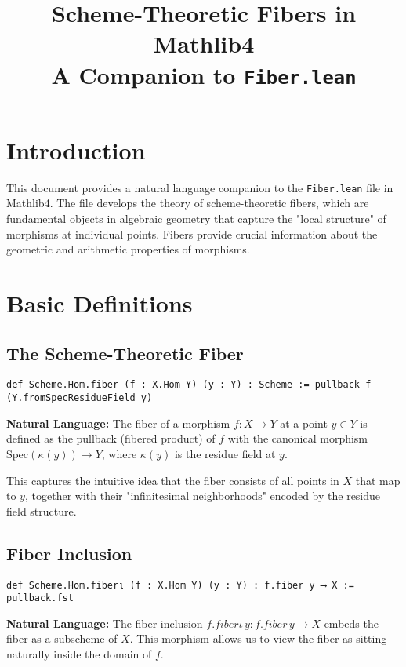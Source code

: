 \documentclass{article}
\title{Scheme-Theoretic Fibers in Mathlib4\\
\large A Companion to \texttt{Fiber.lean}}
\author{}
\date{}
\theoremstyle{definition}
\begin{document}
\maketitle

\section{Introduction}

This document provides a natural language companion to the \texttt{Fiber.lean} file in Mathlib4. The file develops the theory of scheme-theoretic fibers, which are fundamental objects in algebraic geometry that capture the "local structure" of morphisms at individual points. Fibers provide crucial information about the geometric and arithmetic properties of morphisms.

\section{Basic Definitions}

\subsection{The Scheme-Theoretic Fiber}

\begin{lstlisting}
def Scheme.Hom.fiber (f : X.Hom Y) (y : Y) : Scheme := pullback f (Y.fromSpecResidueField y)
\end{lstlisting}

\textbf{Natural Language:} The fiber of a morphism $f: X \to Y$ at a point $y \in Y$ is defined as the pullback (fibered product) of $f$ with the canonical morphism $\mathrm{Spec}(\kappa(y)) \to Y$, where $\kappa(y)$ is the residue field at $y$.

This captures the intuitive idea that the fiber consists of all points in $X$ that map to $y$, together with their "infinitesimal neighborhoods" encoded by the residue field structure.

\subsection{Fiber Inclusion}

\begin{lstlisting}
def Scheme.Hom.fiberι (f : X.Hom Y) (y : Y) : f.fiber y ⟶ X := pullback.fst _ _
\end{lstlisting}

\textbf{Natural Language:} The fiber inclusion $f.fiberι\, y: f.fiber\, y \to X$ embeds the fiber as a subscheme of $X$. This morphism allows us to view the fiber as sitting naturally inside the domain of $f$.
\end{document}

